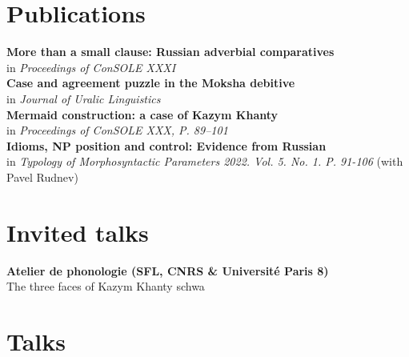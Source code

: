 \documentclass[11pt]{article} %
\begin{document}
\section*{Publications}
 \textbf{More than a small clause: Russian adverbial comparatives} \\ in \emph{Proceedings of ConSOLE XXXI}\\
 \textbf{Case and agreement puzzle in the Moksha debitive} \\ in \emph{Journal of Uralic Linguistics}\\
 \textbf{Mermaid construction: a case of Kazym Khanty}\\ in \emph{Proceedings of ConSOLE XXX, P. 89--101}\\
 \textbf{Idioms, NP position and control: Evidence from Russian}\\ in \emph{Typology of Morphosyntactic Parameters 2022. Vol. 5. No. 1. P. 91-106} (with Pavel Rudnev)\\

\section*{Invited talks}

 \textbf{Atelier de phonologie (SFL, CNRS \& Université Paris 8)}\\ The three faces of Kazym Khanty schwa\\

\section*{Talks}
\end{document}
